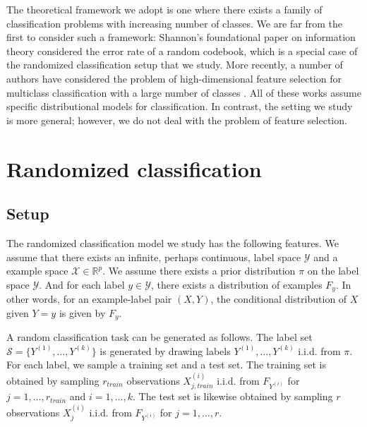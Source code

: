 \documentclass[twoside,11pt]{article}
\begin{document}
The theoretical framework we adopt is one where there exists a family of classification problems with increasing number of classes.  We are far from the first to consider such a framework: Shannon's foundational paper on information theory \citep{Shannon1948} considered the error rate of a random codebook, which is a special case of the randomized classification setup that we study.  More recently, a number of authors have considered the problem of high-dimensional feature selection for multiclass classification with a large number of classes \citep{pan2016ultrahigh, abramovich2015feature, davis2011bayesian}.  All of these works assume specific distributional models for classification.  In contrast, the setting we study is more general; however, we do not deal with the problem of feature selection.




\section{Randomized classification}\label{sec:rc_motivation}


\subsection{Setup}

The randomized classification model we study has the following
features.  We assume that there exists an infinite, perhaps continuous, label space $\mathcal{Y}$ and a example space $\mathcal{X} \in \mathbb{R}^p$.  
We assume there exists a prior distribution $\pi$ on the label space $\mathcal{Y}$.
And for each label $y \in \mathcal{Y}$,
there exists a distribution of examples $F_y$. In other words, for an example-label pair $(X, Y)$, the conditional distribution
of $X$ given $Y = y$ is given by $F_y$.  

A random classification task can be generated as follows.  The
label set $\mathcal{S} = \{Y^{(1)},\hdots, Y^{(k)}\}$ is generated by
drawing labels $Y^{(1)},\hdots, Y^{(k)}$ i.i.d. from $\pi$.  
For each label, we sample a training set and a
test set.  The training set is obtained by sampling $r_{train}$ observations
$X_{j, train}^{(i)}$ i.i.d. from $F_{Y^{(i)}}$ for $j = 1,\hdots,
r_{train}$ and $i = 1,\hdots, k$.  The test set is likewise obtained by sampling $r$
observations $X_j^{(i)}$ i.i.d. from $F_{Y^{(i)}}$ for $j = 1,\hdots,
r$.  
\end{document}
